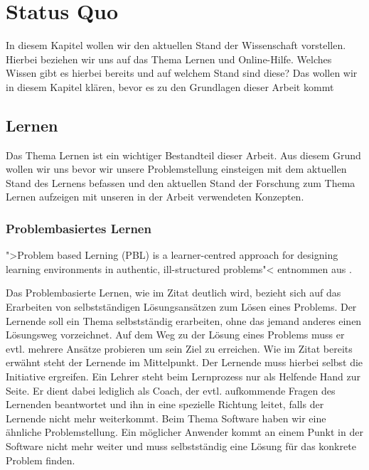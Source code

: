 
\chapter{Status Quo}
In diesem Kapitel wollen wir den aktuellen Stand der Wissenschaft vorstellen. Hierbei beziehen wir uns auf das Thema Lernen und Online-Hilfe. Welches Wissen gibt es hierbei bereits und auf welchem Stand sind diese? Das wollen wir in diesem Kapitel klären, bevor es zu den Grundlagen dieser Arbeit kommt

\section{Lernen}
Das Thema Lernen ist ein wichtiger Bestandteil dieser Arbeit. Aus diesem Grund wollen wir uns bevor wir unsere Problemstellung einsteigen mit dem aktuellen Stand des Lernens befassen und den aktuellen Stand der Forschung zum Thema Lernen aufzeigen mit unseren in der Arbeit verwendeten Konzepten.


\subsection{Problembasiertes Lernen}
">Problem based Lerning (PBL) is a learner-centred approach for designing learning environments in authentic, ill-structured problems"< entnommen aus \cite{zumbachproblembasiertes}. \par

Das Problembasierte Lernen, wie im Zitat deutlich wird, bezieht sich auf das Erarbeiten von selbstständigen Lösungsansätzen zum Lösen eines Problems. Der Lernende soll ein Thema selbstständig erarbeiten, ohne das jemand anderes einen Lösungsweg vorzeichnet. Auf dem Weg zu der Lösung eines Problems muss er evtl. mehrere Ansätze probieren um sein Ziel zu erreichen. Wie im Zitat bereits erwähnt steht der Lernende im Mittelpunkt. Der Lernende muss hierbei selbst die Initiative ergreifen. Ein Lehrer steht beim Lernprozess nur als Helfende Hand zur Seite. Er dient dabei lediglich als Coach, der evtl. aufkommende Fragen des Lernenden beantwortet und ihn in eine spezielle Richtung leitet, falls der Lernende nicht mehr weiterkommt. Beim Thema Software haben wir eine ähnliche Problemstellung. Ein möglicher Anwender kommt an einem Punkt in der Software nicht mehr weiter und muss selbstständig eine Lösung für das konkrete Problem finden. 
 
